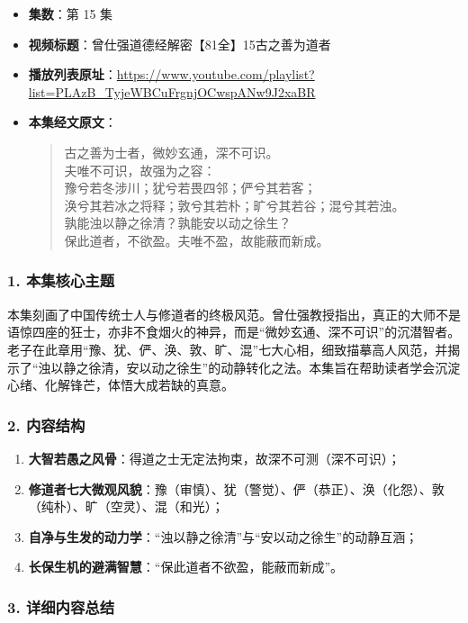 \begin{itemize}
    \item \textbf{集数}：第 15 集
    \item \textbf{视频标题}：曾仕强道德经解密【81全】15古之善为道者
    \item \textbf{播放列表原址}：\url{https://www.youtube.com/playlist?list=PLAzB_TyjeWBCuFrgnjOCwspANw9J2xaBR}
    \item \textbf{本集经文原文}：
    \begin{quote}\kaishu
    古之善为士者，微妙玄通，深不可识。\\
    夫唯不可识，故强为之容：\\
    豫兮若冬涉川；犹兮若畏四邻；俨兮其若客；\\
    涣兮其若冰之将释；敦兮其若朴；旷兮其若谷；混兮其若浊。\\
    孰能浊以静之徐清？孰能安以动之徐生？\\
    保此道者，不欲盈。夫唯不盈，故能蔽而新成。
    \end{quote}
\end{itemize}

\subsubsection{1. 本集核心主题}
本集刻画了中国传统士人与修道者的终极风范。曾仕强教授指出，真正的大师不是语惊四座的狂士，亦非不食烟火的神异，而是“微妙玄通、深不可识”的沉潜智者。老子在此章用“豫、犹、俨、涣、敦、旷、混”七大心相，细致描摹高人风范，并揭示了“浊以静之徐清，安以动之徐生”的动静转化之法。本集旨在帮助读者学会沉淀心绪、化解锋芒，体悟大成若缺的真意。

\subsubsection{2. 内容结构}
\begin{enumerate}
    \item \textbf{大智若愚之风骨}：得道之士无定法拘束，故深不可测（深不可识）；
    \item \textbf{修道者七大微观风貌}：豫（审慎）、犹（警觉）、俨（恭正）、涣（化怨）、敦（纯朴）、旷（空灵）、混（和光）；
    \item \textbf{自净与生发的动力学}：“浊以静之徐清”与“安以动之徐生”的动静互涵；
    \item \textbf{长保生机的避满智慧}：“保此道者不欲盈，能蔽而新成”。
\end{enumerate}

\subsubsection{3. 详细内容总结}

